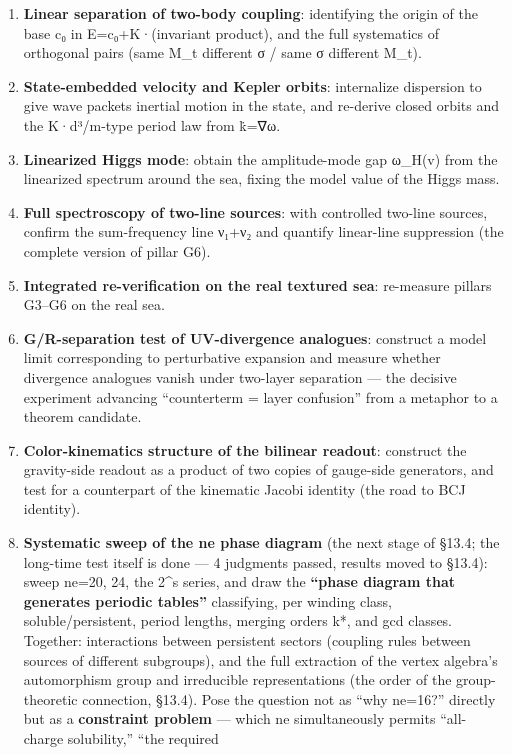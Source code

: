 \documentclass[
]{article}
\begin{document}
\begin{enumerate}
  same G.
\item
  \textbf{Linear separation of two-body coupling}: identifying the
  origin of the base c₀ in E=c₀+K·(invariant product), and the full
  systematics of orthogonal pairs (same M\_t different σ / same σ
  different M\_t).
\item
  \textbf{State-embedded velocity and Kepler orbits}: internalize
  dispersion to give wave packets inertial motion in the state, and
  re-derive closed orbits and the K·d³/m-type period law from k̇=∇ω.
\item
  \textbf{Linearized Higgs mode}: obtain the amplitude-mode gap ω\_H(v)
  from the linearized spectrum around the sea, fixing the model value of
  the Higgs mass.
\item
  \textbf{Full spectroscopy of two-line sources}: with controlled
  two-line sources, confirm the sum-frequency line ν₁+ν₂ and quantify
  linear-line suppression (the complete version of pillar G6).
\item
  \textbf{Integrated re-verification on the real textured sea}:
  re-measure pillars G3--G6 on the real sea.
\item
  \textbf{G/R-separation test of UV-divergence analogues}: construct a
  model limit corresponding to perturbative expansion and measure
  whether divergence analogues vanish under two-layer separation --- the
  decisive experiment advancing ``counterterm = layer confusion'' from a
  metaphor to a theorem candidate.
\item
  \textbf{Color-kinematics structure of the bilinear readout}: construct
  the gravity-side readout as a product of two copies of gauge-side
  generators, and test for a counterpart of the kinematic Jacobi
  identity (the road to BCJ identity).
\item
  \textbf{Systematic sweep of the ne phase diagram} (the next stage of
  §13.4; the long-time test itself is done --- 4 judgments passed,
  results moved to §13.4): sweep ne=20, 24, the 2\^{}s series, and draw
  the \textbf{``phase diagram that generates periodic tables''}
  classifying, per winding class, soluble/persistent, period lengths,
  merging orders k*, and gcd classes. Together: interactions between
  persistent sectors (coupling rules between sources of different
  subgroups), and the full extraction of the vertex algebra's
  automorphism group and irreducible representations (the order of the
  group-theoretic connection, §13.4). Pose the question not as ``why
  ne=16?'' directly but as a \textbf{constraint problem} --- which ne
  simultaneously permits ``all-charge solubility,'' ``the required

\end{enumerate}
\end{document}
